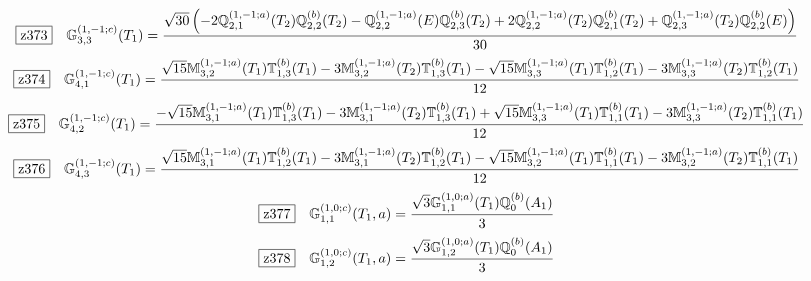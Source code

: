 \documentclass[fleqn,10pt,landscape]{jsarticle}
\begin{document}
\begin{dmath*}
\hspace*{3mm}\fbox{z373}\quad \mathbb{G}_{3,3}^{(1,-1;c)}(T_{1})=\frac{\sqrt{30} \left(- 2 \mathbb{Q}_{2,1}^{(1,-1;a)}(T_{2}) \mathbb{Q}_{2,2}^{(b)}(T_{2}) - \mathbb{Q}_{2,2}^{(1,-1;a)}(E) \mathbb{Q}_{2,3}^{(b)}(T_{2}) + 2 \mathbb{Q}_{2,2}^{(1,-1;a)}(T_{2}) \mathbb{Q}_{2,1}^{(b)}(T_{2}) + \mathbb{Q}_{2,3}^{(1,-1;a)}(T_{2}) \mathbb{Q}_{2,2}^{(b)}(E)\right)}{30}
\end{dmath*}
\begin{dmath*}
\hspace*{3mm}\fbox{z374}\quad \mathbb{G}_{4,1}^{(1,-1;c)}(T_{1})=\frac{\sqrt{15} \mathbb{M}_{3,2}^{(1,-1;a)}(T_{1}) \mathbb{T}_{1,3}^{(b)}(T_{1}) - 3 \mathbb{M}_{3,2}^{(1,-1;a)}(T_{2}) \mathbb{T}_{1,3}^{(b)}(T_{1}) - \sqrt{15} \mathbb{M}_{3,3}^{(1,-1;a)}(T_{1}) \mathbb{T}_{1,2}^{(b)}(T_{1}) - 3 \mathbb{M}_{3,3}^{(1,-1;a)}(T_{2}) \mathbb{T}_{1,2}^{(b)}(T_{1})}{12}
\end{dmath*}
\begin{dmath*}
\hspace*{3mm}\fbox{z375}\quad \mathbb{G}_{4,2}^{(1,-1;c)}(T_{1})=\frac{- \sqrt{15} \mathbb{M}_{3,1}^{(1,-1;a)}(T_{1}) \mathbb{T}_{1,3}^{(b)}(T_{1}) - 3 \mathbb{M}_{3,1}^{(1,-1;a)}(T_{2}) \mathbb{T}_{1,3}^{(b)}(T_{1}) + \sqrt{15} \mathbb{M}_{3,3}^{(1,-1;a)}(T_{1}) \mathbb{T}_{1,1}^{(b)}(T_{1}) - 3 \mathbb{M}_{3,3}^{(1,-1;a)}(T_{2}) \mathbb{T}_{1,1}^{(b)}(T_{1})}{12}
\end{dmath*}
\begin{dmath*}
\hspace*{3mm}\fbox{z376}\quad \mathbb{G}_{4,3}^{(1,-1;c)}(T_{1})=\frac{\sqrt{15} \mathbb{M}_{3,1}^{(1,-1;a)}(T_{1}) \mathbb{T}_{1,2}^{(b)}(T_{1}) - 3 \mathbb{M}_{3,1}^{(1,-1;a)}(T_{2}) \mathbb{T}_{1,2}^{(b)}(T_{1}) - \sqrt{15} \mathbb{M}_{3,2}^{(1,-1;a)}(T_{1}) \mathbb{T}_{1,1}^{(b)}(T_{1}) - 3 \mathbb{M}_{3,2}^{(1,-1;a)}(T_{2}) \mathbb{T}_{1,1}^{(b)}(T_{1})}{12}
\end{dmath*}
\begin{dmath*}
\hspace*{3mm}\fbox{z377}\quad \mathbb{G}_{1,1}^{(1,0;c)}(T_{1},a)=\frac{\sqrt{3} \mathbb{G}_{1,1}^{(1,0;a)}(T_{1}) \mathbb{Q}_{0}^{(b)}(A_{1})}{3}
\end{dmath*}
\begin{dmath*}
\hspace*{3mm}\fbox{z378}\quad \mathbb{G}_{1,2}^{(1,0;c)}(T_{1},a)=\frac{\sqrt{3} \mathbb{G}_{1,2}^{(1,0;a)}(T_{1}) \mathbb{Q}_{0}^{(b)}(A_{1})}{3}
\end{dmath*}
\end{document}
